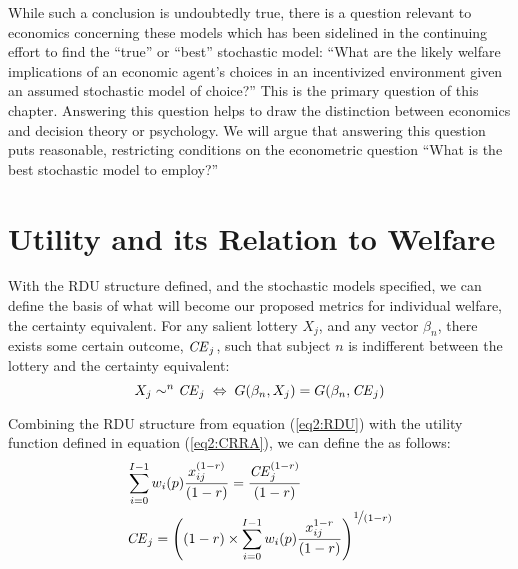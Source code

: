 \documentclass[../main.tex]{subfiles}
\begin{document}
\addtocounter{footnote}{-1}

While such a conclusion is undoubtedly true, there is a question relevant to economics concerning these models which has been sidelined in the continuing effort to find the \enquote{true} or \enquote{best} stochastic model: \enquote{What are the likely welfare implications of an economic agent's choices in an incentivized environment given an assumed stochastic model of choice?} This is the primary question of this chapter.
Answering this question helps to draw the distinction between economics and decision theory or psychology.
We will argue that answering this question puts reasonable, restricting conditions on the econometric question \enquote{What is the best stochastic model to employ?}

\section{Utility and its Relation to Welfare}

With the RDU structure defined, and the stochastic models specified, we can define the basis of what will become our proposed metrics for individual welfare, the certainty equivalent.
For any salient lottery $X_j$, and any vector $\beta_n$, there exists some certain outcome, $\mathit{CE}_j$, such that subject $n$ is indifferent between the lottery and the certainty equivalent:
\begin{equation}
	\label{eq2:CE.indiff}
	X_j \sim^n {\mathit{CE}}_j \;\Leftrightarrow\; G(\beta_n,X_j) = G(\beta_n, {\mathit{CE}}_j)
\end{equation}

Combining the RDU structure from equation (\ref{eq2:RDU}) with the utility function defined in equation (\ref{eq2:CRRA}), we can define the {\CE} as follows:
\begin{align}
	\label{eq2:CEcalc}
	\begin{split}
		&\sum_{i=0}^{I-1} w_i(p) \frac{x_{ij}^{(1-r)}}{(1-r)} = \frac{ {\mathit{CE}}_j^{(1-r)}}{(1-r)}\\
		&{\mathit{CE}}_j =  \left( (1-r) \times \sum_{i=0}^{I-1} w_i(p) \frac{x_{ij}^{1-r}}{(1-r)} \right)^{ \displaystyle\nicefrac{1}{(1-r)} }
	\end{split}
\end{align}
\end{document}
